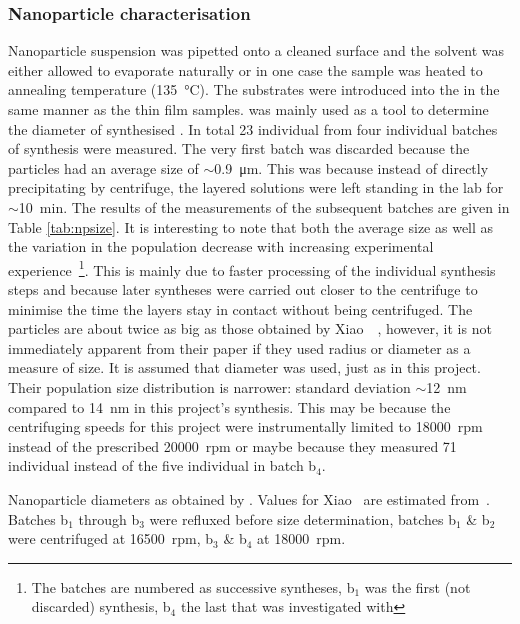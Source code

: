 \subsubsection{Nanoparticle characterisation}
Nanoparticle suspension was pipetted onto a cleaned \ito{} surface and the solvent was either allowed to evaporate naturally or in one case the sample was heated to annealing temperature (\SI{135}{\degreeCelsius}). The \ito{} substrates were introduced into the \sem{} in the same manner as the thin film samples. \sem{} was mainly used as a tool to determine the diameter of synthesised \nps{}. In total 23 individual \nps{} from four individual batches of synthesis were measured. The very first batch was discarded because the particles had an average size of $\sim$\SI{0.9}{\micro\metre}. This was because instead of directly precipitating by centrifuge, the layered solutions were left standing in the lab for $\sim$\SI{10}{\minute}. The results of the measurements of the subsequent batches are given in Table \ref{tab:npsize}. It is interesting to note that both the average size as well as the variation in the population decrease with increasing experimental experience~\footnote{The batches are numbered as successive syntheses,\ie{} b$_1$ was the first (not discarded) synthesis, b$_4$ the last that was investigated with \sem{}}. This is mainly due to faster processing of the individual synthesis steps and because later syntheses were carried out closer to the centrifuge to minimise the time the layers stay in contact without being centrifuged. The particles are about twice as big as those obtained by Xiao~\etal{}~\cite{NPsynthesis}, however, it is not immediately apparent from their paper if they used \np{} radius or \np{} diameter as a measure of size. It is assumed that diameter was used, just as in this project. Their population size distribution is narrower: standard deviation $\sim$\SI{12}{\nano\metre} compared to \SI{14}{\nano\metre} in this project's  synthesis. This may be because the centrifuging speeds for this project were instrumentally limited to \SI{18000}{rpm} instead of the prescribed \SI{20000}{rpm} or maybe because they measured \num{71} individual \nps{} instead of the five individual \nps{} in batch b$_4$.
\begin{table}
\centering
\caption{Nanoparticle diameters as obtained by \sem{}. Values for Xiao~\etal{} are estimated from~\cite[Figure 1f)]{NPsynthesis}. Batches b$_1$ through b$_3$ were refluxed before size determination, batches b$_1$ \& b$_2$ were centrifuged at \SI{16500}{rpm}, b$_3$ \& b$_4$ at \SI{18000}{rpm}.}
\label{tab:npsize}

\end{table}
